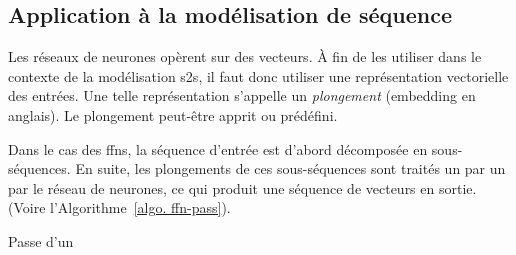 \subsection{Application à la modélisation de séquence}

Les réseaux de neurones opèrent sur des vecteurs.
À fin de les utiliser dans le contexte de la modélisation \gls{s2s}, 
il faut donc utiliser une représentation vectorielle des entrées.
Une telle représentation s'appelle un \emph{plongement} (\foreignlanguage{english}{embedding} en anglais).
Le plongement peut-être apprit ou prédéfini.

Dans le cas des \glspl{ffn}, la séquence d'entrée est d'abord décomposée en sous-séquences.
En suite, les plongements de ces sous-séquences sont traités un par un par le réseau de neurones,
ce qui produit une séquence de vecteurs en sortie.
(Voire l'Algorithme~\ref{algo. ffn-pass}).

\begin{algorithm}[htb]
    \caption{Passe d'un }
    \label{algo. ffn-pass}
\end{algorithm}
